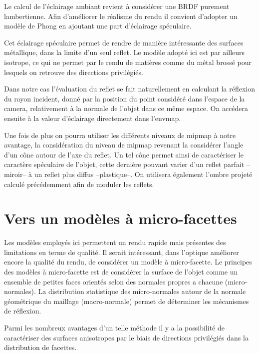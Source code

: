\documentclass[10pt,a4paper,twoside, twocolumn]{report}
\begin{document}
Le calcul de l'éclairage ambiant revient à considérer une BRDF purement lambertienne. Afin d'améliorer le réalisme du rendu il convient d'adopter un modèle de Phong en ajoutant une part d'éclairage spéculaire.

Cet éclairage spéculaire permet de rendre de manière intéressante des surfaces métallique, dans la limite d'un seul reflet. Le modèle adopté ici est par ailleurs isotrope, ce qui ne permet par le rendu de matières comme du métal brossé pour lesquels on retrouve des directions privilégiés.

Dans notre cas l'évaluation du reflet se fait naturellement en calculant la réflexion du rayon incident, donné par la position du point considéré dans l'espace de la camera, relativement à la normale de l'objet dans ce même espace. On accédera ensuite à la valeur d'éclairage directement dans l'envmap.

Une fois de plus on pourra utiliser les différents niveaux de mipmap à notre avantage, la considération du niveau de mipmap revenant la considérer l'angle d'un cône autour de l'axe du reflet. Un tel cône permet ainsi de caractériser le caractère spéculaire de l'objet, cette dernière pouvant varier d'un reflet parfait --miroir-- à un reflet plus diffus --plastique--.
On utilisera également l'ombre projeté calculé précédemment afin de moduler les reflets.


\section{Vers un modèles à micro-facettes}

Les modèles employés ici permettent un rendu rapide mais présentes des limitations en terme de qualité. Il serait intéressant, dans l'optique améliorer encore la qualité du rendu, de considérer un modèle à micro-facette. 
Le principes des modèles à micro-facette est de considérer la surface de l'objet comme un ensemble de petites faces orientés selon des normales propres a chacune (micro-normales). La distribution statistique des micro-normales autour de la normale géométrique du maillage (macro-normale) permet de déterminer les mécanismes de réflexion\cite{Bruneton2010}\cite{Dupuy2012}\cite{Heitz2013}.

Parmi les nombreux avantages d'un telle méthode il y a la possibilité de caractériser des surfaces anisotropes par le biais de directions privilégiés dans la distribution de facettes.
\end{document}
